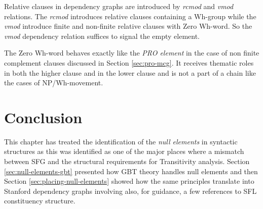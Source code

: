 
Relative clauses in dependency graphs are introduced by \textit{rcmod} and \textit{vmod} relations. The \textit{rcmod} introduces relative clauses containing a Wh-group while the \textit{vmod} introduce finite and non-finite relative clauses with Zero Wh-word. So the \textit{vmod} dependency relation suffices to signal the empty element. 

The Zero Wh-word behaves exactly like the \textit{PRO element} in the case of non finite complement clauses discussed in Section \ref{sec:pro-mcg}. It receives thematic roles in both the higher clause and in the lower clause and is not a part of a chain like the cases of NP/Wh-movement.

\section{Conclusion}
This chapter has treated the identification of the \textit{null elements} in syntactic structures as this was identified as one of the major places where a mismatch between SFG and the structural requirements for Transitivity analysis. Section \ref{sec:null-elements-gbt} presented how GBT theory handles null elements and then Section \ref{sec:placing-null-elements} showed how the same principles translate into Stanford dependency graphs involving also, for guidance, a few references to SFL constituency structure.

